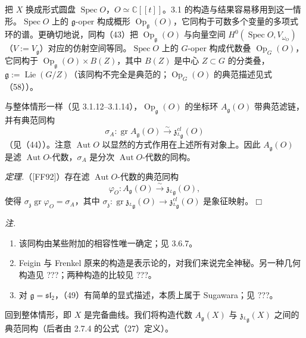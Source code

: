 
 把 $X$ 换成形式圆盘 $\operatorname{Spec} O$，$O \simeq \mathbb{C}[[t]]$。3.1 的构造与结果容易移用到这一情形。$\operatorname{Spec} O$ 上的 $\mathfrak{g}$-oper 构成概形 $\operatorname{Op}_{\mathfrak{g}}(O)$，它同构于可数多个变量的多项式环的谱。更确切地说，同构（43）把 $\operatorname{Op}_{\mathfrak{g}}(O)$ 与向量空间 $H^0(\operatorname{Spec} O,V_{\omega_O})$（$V := V_{\mathfrak{g}}$）对应的仿射空间等同。$\operatorname{Spec} O$ 上的 $G$-oper 构成代数叠 $\operatorname{Op}_G(O)$，它同构于 $\operatorname{Op}_{\mathfrak{g}}(O) \times B(Z)$，其中 $B(Z)$ 是中心 $Z \subset G$ 的分类叠，$\mathfrak{g} := \operatorname{Lie}(G/Z)$（该同构不完全是典范的；$\operatorname{Op}_G(O)$ 的典范描述见式（58））。


与整体情形一样（见 3.1.12--3.1.14），$\operatorname{Op}_{\mathfrak{g}}(O)$ 的坐标环 $A_{\mathfrak{g}}(O)$ 带典范滤链，并有典范同构
\begin{equation}\tag{48}
\sigma_A: \operatorname{gr} A_{\mathfrak{g}}(O) \xrightarrow{\sim} \mathfrak{z}^{cl}_{{}^{L}\mathfrak{g}}(O)
\end{equation}
（见（44））。注意 $\operatorname{Aut} O$ 以显然的方式作用在上述所有对象上。因此 $A_{\mathfrak{g}}(O)$ 是滤 $\operatorname{Aut} O$-代数，$\sigma_A$ 是分次 $\operatorname{Aut} O$-代数的同构。

 \emph{定理.}（[FF92]）存在滤 $\operatorname{Aut} O$-代数的典范同构
\begin{equation}\tag{49}
\varphi_O: A_{\mathfrak{g}}(O) \xrightarrow{\sim} \mathfrak{z}_{{}^{L}\mathfrak{g}}(O),
\end{equation}
使得 $\sigma_{\mathfrak{z}}\operatorname{gr}\varphi_O = \sigma_A$，其中 $\sigma_{\mathfrak{z}}: \operatorname{gr}\mathfrak{z}_{{}^{L}\mathfrak{g}}(O) \to \mathfrak{z}^{cl}_{{}^{L}\mathfrak{g}}(O)$ 是象征映射。\hfill$\Box$

\emph{注.}
\begin{enumerate}[label=(\roman*),leftmargin=2.2em]
\item 该同构由某些附加的相容性唯一确定；见 3.6.7。
\item Feigin 与 Frenkel 原来的构造是表示论的，对我们来说完全神秘。另一种几何构造见 ???；两种构造的比较见 ???。
\item 对 $\mathfrak{g} = \mathfrak{sl}_2$，（49）有简单的显式描述，本质上属于 Sugawara；见 ???。
\end{enumerate}


 回到整体情形，即 $X$ 是完备曲线。我们将构造代数 $A_{\mathfrak{g}}(X)$ 与 $\mathfrak{z}_{{}^{L}\mathfrak{g}}(X)$ 之间的典范同构（后者由 2.7.4 的公式（27）定义）。
